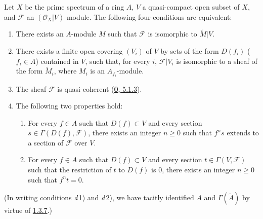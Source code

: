 \begin{theorem}[1.4.1]
\label{I.1.4.1}
Let $X$ be the prime spectrum of a ring $A$, $V$ a quasi-compact open subset
of $X$, and $\mathscr{F}$ an $(\mathscr{O}_X|V)$-module. The following
four conditions are equivalent:
\begin{enumerate}
  \item[\textup{a)}] There exists an $A$-module $M$ such that $\mathscr{F}$
  is isomorphic to $\widetilde{M}|V$.
  \item[\textup{b)}] There exists a finite open covering $(V_i)$ of $V$ by
  sets of the form $D(f_i)$ ($f_i\in A$) contained in $V$, such that,
  for every $i$, $\mathscr{F}|V_i$ is isomorphic to a sheaf of the form
  $\widetilde{M}_i$, where $M_i$ is an $A_{f_i}$-module.
  \item[\textup{c)}] The sheaf $\mathscr{F}$ is quasi-coherent
  \textup{(\hyperref[0.5.1.3]{\textbf{0}, 5.1.3})}.
  \item[\textup{d)}] The following two properties hold:
  \begin{enumerate}
    \item[\textup{d\,1)}] For every $f\in A$ such that $D(f)\subset V$ and
    every section $s\in\Gamma(D(f),\mathscr{F})$, there exists an integer
    $n\geq0$ such that $f^n s$ extends to a section of $\mathscr{F}$ over $V$.
    \item[\textup{d\,2)}] For every $f\in A$ such that $D(f)\subset V$ and
    every section $t\in\Gamma(V,\mathscr{F})$ such that the restriction of
    $t$ to $D(f)$ is $0$, there exists an integer $n\geq0$ such that
    $f^n t=0$.
  \end{enumerate}
\end{enumerate}
\end{theorem}

(In writing conditions \textit{d}\,1) and \textit{d}\,2), we have tacitly
identified $A$ and $\Gamma(\widetilde{A})$ by virtue of
\hyperref[I.1.3.7]{1.3.7}.)

